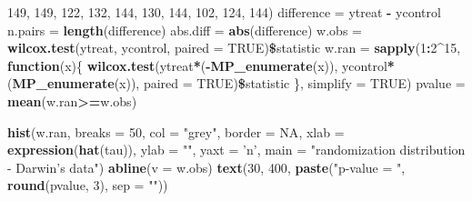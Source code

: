 \documentclass[]{article}
\newenvironment{Shaded}{\begin{snugshade}}{\end{snugshade}}
\newcommand{\KeywordTok}[1]{\textcolor[rgb]{0.13,0.29,0.53}{\textbf{#1}}}
\newcommand{\DataTypeTok}[1]{\textcolor[rgb]{0.13,0.29,0.53}{#1}}
\newcommand{\DecValTok}[1]{\textcolor[rgb]{0.00,0.00,0.81}{#1}}
\newcommand{\StringTok}[1]{\textcolor[rgb]{0.31,0.60,0.02}{#1}}
\newcommand{\OtherTok}[1]{\textcolor[rgb]{0.56,0.35,0.01}{#1}}
\newcommand{\ControlFlowTok}[1]{\textcolor[rgb]{0.13,0.29,0.53}{\textbf{#1}}}
\newcommand{\OperatorTok}[1]{\textcolor[rgb]{0.81,0.36,0.00}{\textbf{#1}}}
\newcommand{\NormalTok}[1]{#1}
\begin{document}
\begin{Shaded}
\begin{Highlighting}[]
               \DecValTok{149}\NormalTok{, }\DecValTok{149}\NormalTok{, }\DecValTok{122}\NormalTok{, }\DecValTok{132}\NormalTok{, }\DecValTok{144}\NormalTok{, }
               \DecValTok{130}\NormalTok{, }\DecValTok{144}\NormalTok{, }\DecValTok{102}\NormalTok{, }\DecValTok{124}\NormalTok{, }\DecValTok{144}\NormalTok{)}
\NormalTok{difference =}\StringTok{ }\NormalTok{ytreat }\OperatorTok{-}\StringTok{ }\NormalTok{ycontrol}
\NormalTok{n.pairs    =}\StringTok{ }\KeywordTok{length}\NormalTok{(difference)}
\NormalTok{abs.diff   =}\StringTok{ }\KeywordTok{abs}\NormalTok{(difference)}
\NormalTok{w.obs =}\StringTok{ }\KeywordTok{wilcox.test}\NormalTok{(ytreat, ycontrol, }\DataTypeTok{paired =} \OtherTok{TRUE}\NormalTok{)}\OperatorTok{\$}\NormalTok{statistic}
\NormalTok{w.ran      =}\StringTok{ }\KeywordTok{sapply}\NormalTok{(}\DecValTok{1}\OperatorTok{:}\DecValTok{2}\OperatorTok{^}\DecValTok{15}\NormalTok{, }
                    \ControlFlowTok{function}\NormalTok{(x)\{ }
                      \KeywordTok{wilcox.test}\NormalTok{(ytreat}\OperatorTok{*}\NormalTok{(}\OperatorTok{-}\KeywordTok{MP_enumerate}\NormalTok{(x)), ycontrol}\OperatorTok{*}\NormalTok{(}\KeywordTok{MP_enumerate}\NormalTok{(x)), }\DataTypeTok{paired =} \OtherTok{TRUE}\NormalTok{)}\OperatorTok{\$}\NormalTok{statistic}
\NormalTok{                      \}, }\DataTypeTok{simplify =} \OtherTok{TRUE}\NormalTok{)}
\NormalTok{pvalue     =}\StringTok{ }\KeywordTok{mean}\NormalTok{(w.ran}\OperatorTok{>=}\NormalTok{w.obs)}

\KeywordTok{hist}\NormalTok{(w.ran, }\DataTypeTok{breaks =} \DecValTok{50}\NormalTok{, }\DataTypeTok{col =} \StringTok{"grey"}\NormalTok{, }\DataTypeTok{border =} \OtherTok{NA}\NormalTok{,}
     \DataTypeTok{xlab =} \KeywordTok{expression}\NormalTok{(}\KeywordTok{hat}\NormalTok{(tau)), }
     \DataTypeTok{ylab =} \StringTok{""}\NormalTok{, }\DataTypeTok{yaxt =} \StringTok{'n'}\NormalTok{, }
     \DataTypeTok{main =} \StringTok{"randomization distribution - Darwin's data"}\NormalTok{)}
\KeywordTok{abline}\NormalTok{(}\DataTypeTok{v =}\NormalTok{ w.obs)}
\KeywordTok{text}\NormalTok{(}\DecValTok{30}\NormalTok{, }\DecValTok{400}\NormalTok{, }
     \KeywordTok{paste}\NormalTok{(}\StringTok{"p-value = "}\NormalTok{, }\KeywordTok{round}\NormalTok{(pvalue, }\DecValTok{3}\NormalTok{), }\DataTypeTok{sep =} \StringTok{""}\NormalTok{))}
\end{Highlighting}
\end{Shaded}
\end{document}
